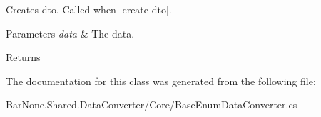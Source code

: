 Creates dto. Called when \mbox{[}create dto\mbox{]}. 


\begin{DoxyParams}{Parameters}
{\em data} & The data.\\
\hline
\end{DoxyParams}
\begin{DoxyReturn}{Returns}

\end{DoxyReturn}


The documentation for this class was generated from the following file\+:\begin{DoxyCompactItemize}
\item 
Bar\+None.\+Shared.\+Data\+Converter/\+Core/Base\+Enum\+Data\+Converter.\+cs\end{DoxyCompactItemize}
